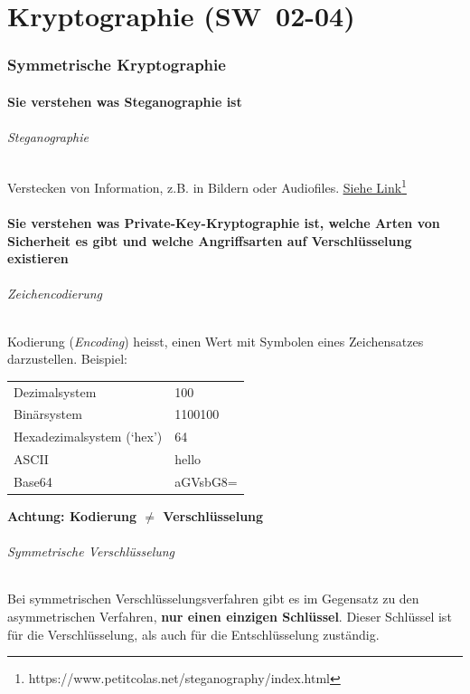 \documentclass[10pt,a4paper]{article}
\begin{document}
\part{Kryptographie (SW~02-04)}
\section{Symmetrische Kryptographie}
\subsection*{Sie verstehen was Steganographie ist}
\paragraph*{Steganographie}Verstecken von Information, z.B. in Bildern oder Audiofiles. \underline{\href{https://www.petitcolas.net/steganography/index.html}{Siehe Link}}\footnote{https://www.petitcolas.net/steganography/index.html}


\subsection*{Sie verstehen was Private-Key-Kryptographie ist, welche Arten von Sicherheit es gibt und welche Angriffsarten auf Verschlüsselung existieren}

\paragraph*{Zeichencodierung}Kodierung (\textsl{Encoding}) heisst, einen Wert mit Symbolen eines Zeichensatzes darzustellen. Beispiel:\newline %
\begin{tabular}{|ll|}
    \hline
        Dezimalsystem & 100\\
        Binärsystem & 1100100\\
        Hexadezimalsystem (`hex') & 64\\
        ASCII & hello\\
        Base64 & aGVsbG8=\\
    \hline
\end{tabular}
{\color{red}\textbf{Achtung: Kodierung $\neq$ Verschlüsselung}}

\paragraph*{Symmetrische Verschlüsselung}Bei symmetrischen Verschlüsselungsverfahren gibt es im Gegensatz zu den asymmetrischen Verfahren, \textbf{nur einen einzigen Schlüssel}. Dieser Schlüssel ist für die Verschlüsselung, als auch für die Entschlüsselung zuständig.
\end{document}
